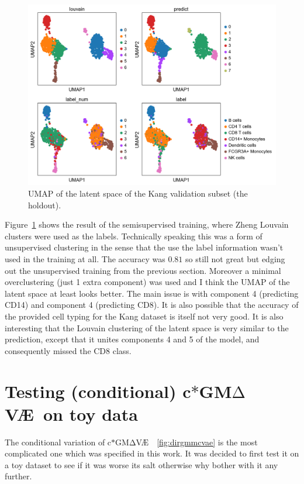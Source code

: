 \documentclass[11pt, a4paper]{report}
\theoremstyle{plain}
\theoremstyle{definition}
\theoremstyle{remark}
\newcommand{\gmvae}{c$\ast$GM$\mathrm{\Delta}$V\AE~}
\begin{document}
\begin{figure}[h]
\centering
\includegraphics[width=1.1\textwidth]{images/gmmvae_kang_new_latent_louvain_pred_umap1.png}
\caption{
UMAP of the latent space of the Kang validation subset (the holdout).
}
\label{fig:kang_new_latent}
\end{figure}

Figure~\ref{fig:kang_new_latent} shows the result of the semisupervised
training, where Zheng Louvain clusters were used as the labels. Technically
speaking this was a form of unsupervised clustering in the sense that the
use the label information wasn't used in the training at all.
The accuracy was $0.81$ so still
not great but edging out the unsupervised training from the previous section.
Moreover a minimal overclustering (just 1 extra component) was used and I 
think the UMAP of the latent space at least looks better. The main issue is with
component 4 (predicting CD14) and component 4 (predicting CD8). It is also
possible that the accuracy of the provided cell typing for the Kang dataset is
itself not very good.
It is also interesting that the Louvain clustering of the latent space is very
similar to the prediction, except that it unites components 4 and 5 of the
model, and consequently missed the CD8 class.

\chapter{Testing (conditional) \gmvae on toy data}
\label{chapter:toydata}
The conditional variation of \gmvae~\ref{fig:dirgmmcvae} is the most complicated one 
which was 
specified in this work. 
It was decided to first test it on a toy dataset to see if it was worse
its salt otherwise why bother with it any further.
\end{document}
